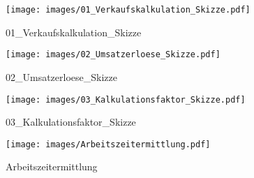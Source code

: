 %
%
%
\begin{figure}[!hb]%
    \centering
  \texttt{[image: images/01\_Verkaufskalkulation\_Skizze.pdf]}%
  \caption{01_Verkaufskalkulation_Skizze}%
\end{figure}

%
%
\begin{figure}[!hb]%
    \centering
  \texttt{[image: images/02\_Umsatzerloese\_Skizze.pdf]}%
  \caption{02_Umsatzerloese_Skizze}%
\end{figure}

%
%
\begin{figure}[!hb]%
    \centering
  \texttt{[image: images/03\_Kalkulationsfaktor\_Skizze.pdf]}%
  \caption{03_Kalkulationsfaktor_Skizze}%
\end{figure}

%
%
\begin{figure}[!hb]%
    \centering
  \texttt{[image: images/Arbeitszeitermittlung.pdf]}%
  \caption{Arbeitszeitermittlung}%
\end{figure}

